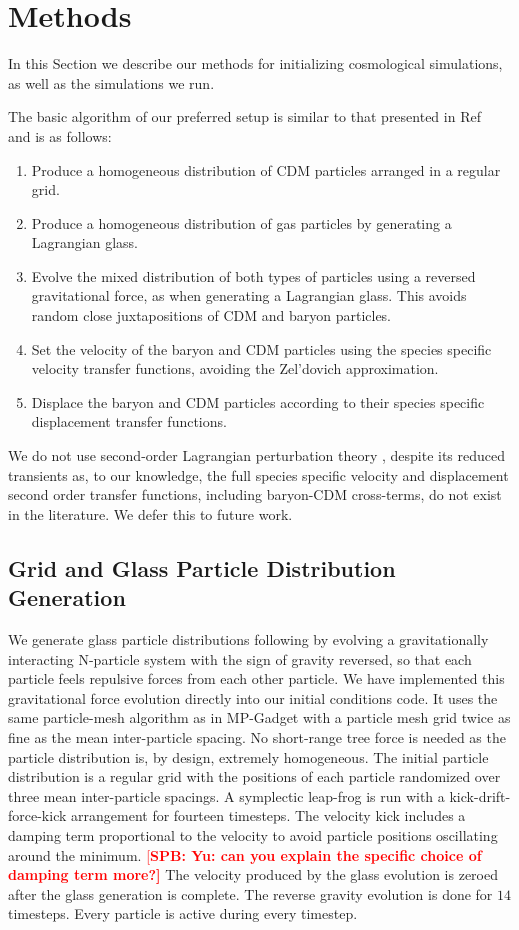 \documentclass[a4paper,11pt]{article}
\newcommand{\spb}[1]{\textcolor{red}{[\bf SPB: #1]} }
\begin{document}
\section{Methods}

In this Section we describe our methods for initializing cosmological simulations, as well as the simulations we run.

The basic algorithm of our preferred setup is similar to that presented in Ref~\cite{Yoshida:2003} and is as follows:
\begin{enumerate}
 \item Produce a homogeneous distribution of CDM particles arranged in a regular grid.
 \item Produce a homogeneous distribution of gas particles by generating a Lagrangian glass.
 \item Evolve the mixed distribution of both types of particles using a reversed gravitational force, as when generating a Lagrangian glass. This avoids random close juxtapositions of CDM and baryon particles.
 \item Set the velocity of the baryon and CDM particles using the species specific velocity transfer functions, avoiding the Zel'dovich approximation.
  \item Displace the baryon and CDM particles according to their species specific displacement transfer functions.
\end{enumerate}

We do not use second-order Lagrangian perturbation theory \cite{Scoccimarro:1998}, despite its reduced transients as, to our knowledge, the full species specific velocity and displacement second order transfer functions, including baryon-CDM cross-terms, do not exist in the literature. We defer this to future work. 

\subsection{Grid and Glass Particle Distribution Generation}
\label{sec:glass}

We generate glass particle distributions following \cite{White:1994} by evolving a gravitationally interacting N-particle system with the sign of gravity reversed, so that each particle feels repulsive forces from each other particle. We have implemented this  gravitational force evolution directly into our initial conditions code. It uses the same particle-mesh algorithm as in MP-Gadget with a particle mesh grid twice as fine as the mean inter-particle spacing. No short-range tree force is needed as the particle distribution is, by design, extremely homogeneous. The initial particle distribution is a regular grid with the positions of each particle randomized over three mean inter-particle spacings. A symplectic leap-frog is run with a kick-drift-force-kick arrangement for fourteen timesteps. The velocity kick includes a damping term proportional to the velocity to avoid particle positions oscillating around the minimum. \spb{Yu: can you explain the specific choice of damping term more?} The velocity produced by the glass evolution is zeroed after the glass generation is complete. The reverse gravity evolution is done for $14$ timesteps. Every particle is active during every timestep.
\end{document}
